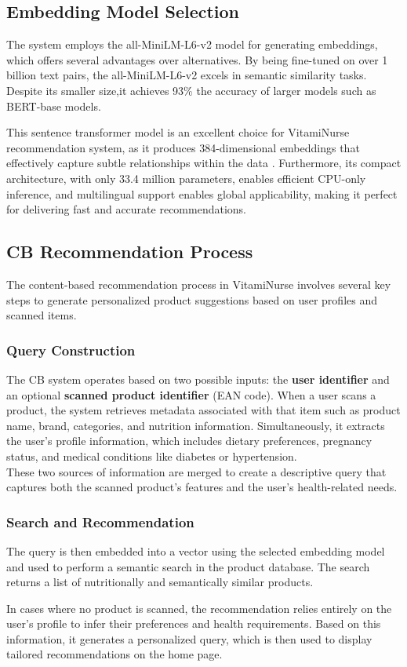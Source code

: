\subsection{Embedding Model Selection}
\par The system employs the all-MiniLM-L6-v2 model for generating embeddings, which offers several advantages over alternatives. 
By being fine-tuned on over 1 billion text pairs, the all-MiniLM-L6-v2 excels in semantic similarity tasks. 
Despite its smaller size,it achieves 93\% the accuracy of larger models such as BERT-base models. 

\par This sentence transformer model is an excellent choice for VitamiNurse recommendation system, as it produces 384-dimensional embeddings that effectively capture subtle relationships within the data \cite{sentence-transformers-all-MiniLM-L12-v2}. Furthermore, its compact architecture, with only 33.4 million parameters, enables
efficient CPU-only inference, and multilingual support enables global applicability, making it
perfect for delivering fast and accurate recommendations.


\subsection{CB Recommendation Process}
 The content-based recommendation process in VitamiNurse involves several key steps to generate personalized product suggestions based on user profiles and scanned items.
\subsubsection{Query Construction}
\par The CB system operates based on two possible inputs: the \textbf{user identifier} and an optional \textbf{scanned product identifier} (EAN code). When a user scans a product, the system retrieves metadata associated with that item such as product name, brand, categories, and nutrition information. Simultaneously, it extracts the user’s profile information, which includes dietary preferences, pregnancy status, and medical conditions like diabetes or hypertension.\\
These two sources of information are merged to create a descriptive query that captures both the scanned product’s features and the user's health-related needs. 

\subsubsection{Search and Recommendation}
The query is then embedded into a vector using the selected embedding model and used to perform a semantic search in the product database. The search returns a list of nutritionally and semantically similar products.
\par In cases where no product is scanned, the recommendation relies entirely on the user’s profile to infer their preferences and health requirements. Based on this information, it generates a personalized query, which is then used to display tailored recommendations on the home page.


